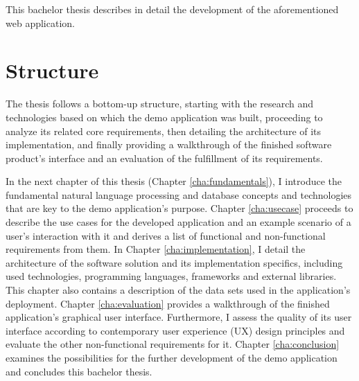 This bachelor thesis describes in detail the development of the aforementioned web application.

\section{Structure}
The thesis follows a bottom-up structure, starting with the research and technologies based on which the demo application was built, proceeding to analyze its related core requirements, then detailing the architecture of its implementation, and finally providing a walkthrough of the finished software product's interface and an evaluation of the fulfillment of its requirements.

In the next chapter of this thesis (Chapter \ref{cha:fundamentals}), I introduce the fundamental natural language processing and database concepts and technologies that are key to the demo application's purpose. Chapter \ref{cha:usecase} proceeds to describe the use cases for the developed application and an example scenario of a user's interaction with it and derives a list of functional and non-functional requirements from them. In Chapter \ref{cha:implementation}, I detail the architecture of the software solution and its implementation specifics, including used technologies, programming languages, frameworks and external libraries. This chapter also contains a description of the data sets used in the application's deployment. Chapter \ref{cha:evaluation} provides a walkthrough of the finished application's graphical user interface. Furthermore, I assess the quality of its user interface according to contemporary user experience (UX) design principles and evaluate the other non-functional requirements for it. Chapter \ref{cha:conclusion} examines the possibilities for the further development of the demo application and concludes this bachelor thesis.